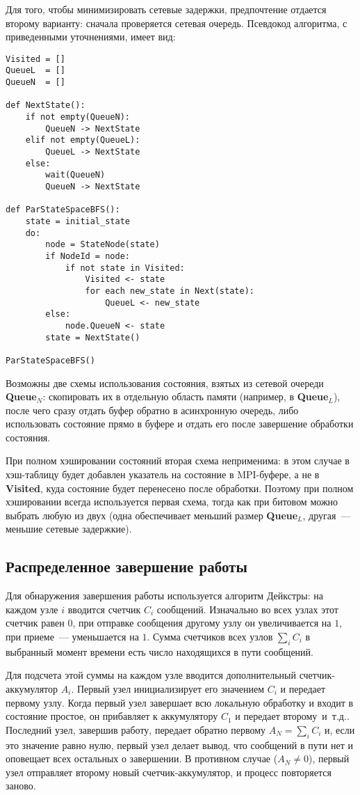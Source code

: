 \documentclass[12pt,a4paper,fleqn]{article}
\newcommand{\Code}[1]{\textbf{\mbox{#1}}}
\newcommand\etc{~и~т.д.}
\begin{document}
Для того, чтобы минимизировать сетевые задержки, предпочтение отдается второму варианту: сначала
проверяется сетевая очередь. Псевдокод алгоритма, с приведенными уточнениями, имеет вид:

\begin{lstlisting}[style=pseudocode]
Visited = []
QueueL  = []
QueueN  = []

def NextState():
    if not empty(QueueN):
        QueueN -> NextState
    elif not empty(QueueL):
        QueueL -> NextState
    else:
        wait(QueueN)
        QueueN -> NextState

def ParStateSpaceBFS():
    state = initial_state
    do:
        node = StateNode(state)
        if NodeId = node:
            if not state in Visited:
                Visited <- state
                for each new_state in Next(state):
                    QueueL <- new_state
        else:
            node.QueueN <- state
        state = NextState()

ParStateSpaceBFS()
\end{lstlisting}

Возможны две схемы использования состояния, взятых из сетевой очереди \Code{Queue$_N$}: скопировать
их в отдельную область памяти (например, в \Code{Queue$_L$}), после чего сразу отдать буфер обратно
в асинхронную очередь, либо использовать состояние прямо в буфере и отдать его после завершение
обработки состояния.

При полном хэшировании состояний вторая схема неприменима: в этом случае в хэш-таблицу будет
добавлен указатель на состояние в MPI-буфере, а не в \Code{Visited}, куда состояние будет перенесено
после обработки. Поэтому при полном хэшировании всегда используется первая схема, тогда как при
битовом можно выбрать любую из двух (одна обеспечивает меньший размер \Code{Queue$_L$}, другая~---
меньшие сетевые задержкие).

\subsection{Распределенное завершение работы}

Для обнаружения завершения работы используется алгоритм Дейкстры: на каждом узле $i$
вводится счетчик $C_i$ сообщений. Изначально во всех узлах этот счетчик равен $0$, при
отправке сообщения другому узлу он увеличивается на $1$, при приеме~--- уменьшается на
$1$. Сумма счетчиков всех узлов $\sum_iC_i$ в выбранный момент времени есть число
находящихся в пути сообщений. 

Для подсчета этой суммы на каждом узле вводится дополнительный счетчик-аккумулятор
$A_i$. Первый узел инициализирует его значением $C_i$ и передает первому узлу. Когда
первый узел завершает всю локальную обработку и входит в состояние простое, он прибавляет
к аккумулятору $C_1$ и передает второму\etc. Последний узел, завершив работу, передает
обратно первому $A_N = \sum_iC_i$ и, если это значение равно нулю, первый узел делает
вывод, что сообщений в пути нет и оповещает всех остальных о завершении. В противном
случае ($A_N \neq 0$), первый узел отправляет второму новый счетчик-аккумулятор, и процесс
повторяется заново.
\end{document}
